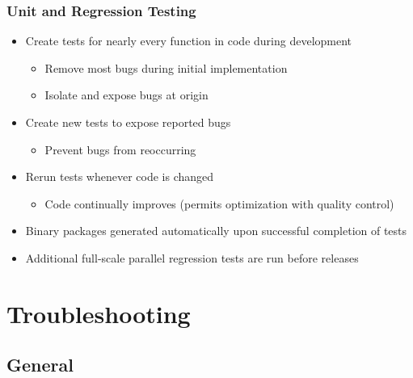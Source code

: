 \documentclass{beamer}
\begin{document}
\begin{frame}
  \frametitle{Unit and Regression Testing}

  \begin{itemize}
  \item Create tests for nearly every function in code during development
    \begin{itemize}
    \item Remove most bugs during initial implementation
    \item Isolate and expose bugs at origin
    \end{itemize}
  \item Create new tests to expose reported bugs
    \begin{itemize}
    \item Prevent bugs from reoccurring
    \end{itemize}
  \item Rerun tests whenever code is changed
    \begin{itemize}
    \item Code continually improves (permits optimization with
      quality control)
    \end{itemize}
  \item Binary packages generated automatically upon successful
    completion of tests
  \item Additional full-scale parallel regression tests are run before releases
  \end{itemize}

\end{frame}

\section{Troubleshooting}
\subsection{General}
\end{document}
